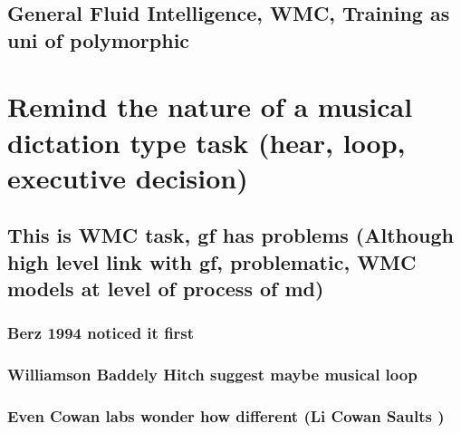 \documentclass[]{book}
\theoremstyle{definition}
\theoremstyle{definition}
\theoremstyle{definition}
\theoremstyle{remark}
\begin{document}
\hypertarget{general-fluid-intelligence-wmc-training-as-uni-of-polymorphic}{%
\subsection{General Fluid Intelligence, WMC, Training as uni of
polymorphic}\label{general-fluid-intelligence-wmc-training-as-uni-of-polymorphic}}

\hypertarget{remind-the-nature-of-a-musical-dictation-type-task-hear-loop-executive-decision}{%
\section{Remind the nature of a musical dictation type task (hear, loop,
executive
decision)}\label{remind-the-nature-of-a-musical-dictation-type-task-hear-loop-executive-decision}}

\hypertarget{this-is-wmc-task-gf-has-problems-although-high-level-link-with-gf-problematic-wmc-models-at-level-of-process-of-md}{%
\subsection{This is WMC task, gf has problems (Although high level link
with gf, problematic, WMC models at level of process of
md)}\label{this-is-wmc-task-gf-has-problems-although-high-level-link-with-gf-problematic-wmc-models-at-level-of-process-of-md}}

\hypertarget{berz-1994-noticed-it-first}{%
\subsubsection{Berz 1994 noticed it
first}\label{berz-1994-noticed-it-first}}

\hypertarget{williamson-baddely-hitch-suggest-maybe-musical-loop}{%
\subsubsection{Williamson Baddely Hitch suggest maybe musical
loop}\label{williamson-baddely-hitch-suggest-maybe-musical-loop}}

\hypertarget{even-cowan-labs-wonder-how-different-li-cowan-saults}{%
\subsubsection{Even Cowan labs wonder how different (Li Cowan Saults
)}\label{even-cowan-labs-wonder-how-different-li-cowan-saults}}
\end{document}
